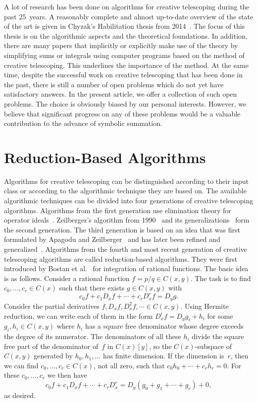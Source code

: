 \documentclass[a4paper,draft]{amsart}
\begin{document}
 A lot of research has been done on algorithms for creative telescoping during
 the past 25~years. A reasonably complete and almost up-to-date overview of the
 state of the art is given in Chyzak's Habilitation thesis from
 2014~\cite{chyzak14}. The focus of this thesis is on the algorithmic aspects
 and the theoretical foundations. In addition, there are many papers that
 implicitly or explicitly make use of the theory by simplifying sums or
 integrals using computer programs based on the method of creative
 telescoping. This underlines the importance of the method. At the same time,
 despite the successful work on creative telescoping that has been done in the
 past, there is still a number of open problems which do not yet have
 satisfactory answers. In the present article, we offer a collection of such
 open problems. The choice is obviously biased by our personal interests.
 However, we believe that significant progress on any of these problems would be
 a valuable contribution to the advance of symbolic summation.

\section{Reduction-Based Algorithms}

 Algorithms for creative telescoping can be distinguished according to their input
 class or according to the algorithmic technique they are based on. The available
 algorithmic techniques can be divided into four generations of creative telescoping algorithms.
 Algorithms from the first generation use elimination theory for operator ideals~\cite{fasenmyer49,takayama90,takayama90a,petkovsek97,wegschaider97,chyzak98}.
 Zeilberger's algorithm from 1990~\cite{zeilberger90a} and its generalizations~\cite{almkvist90,chyzak00,kauers07n,schneider13b} form the second generation.
 The third generation is based on an idea that was first formulated by Apagodu and Zeilberger~\cite{mohammed05,apagodu06}
 and has later been refined and generalized~\cite{koutschan10b,chen12b,chen12c,chen14a}.
 Algorithms from the fourth and most recent generation of creative telescoping algorithms are called
 reduction-based algorithms. They were first introduced by Bostan et al.~\cite{bostan10b} for
 integration of rational functions. The basic idea is as follows. Consider a rational
 function $f=p/q\in C(x,y)$. The task is to find $c_0,\dots,c_r\in C(x)$ such that there
 exists $g\in C(x,y)$ with
 \[
   c_0 f + c_1 D_x f + \cdots + c_r D_x^r f = D_y g.
 \]
 Consider the partial derivatives $f,D_xf,D_x^2f,\cdots\in C(x,y)$. Using Hermite reduction,
 we can write each of them in the form $D_x^i f = D_y g_i + h_i$ for some $g_i,h_i\in C(x,y)$
 where $h_i$ has a square free denominator whose degree exceeds the degree of its numerator.
 The denominators of all these $h_i$ divide the square free part of the denominator of~$f$
 in $C(x)[y]$, so the $C(x)$-subspace of $C(x,y)$ generated by $h_0,h_1,\dots$ has finite
 dimension. If the dimension is~$r$, then we can find $c_0,\dots,c_r\in C(x)$, not all zero,
 such that $c_0h_0+\cdots+c_rh_r=0$. For these $c_0,\dots,c_r$ we then have
 \[
   c_0 f + c_1 D_x f + \cdots + c_r D_x^r = D_y (g_0 + g_1 + \cdots + g_r) + 0,
 \]
 as desired.
\end{document}
